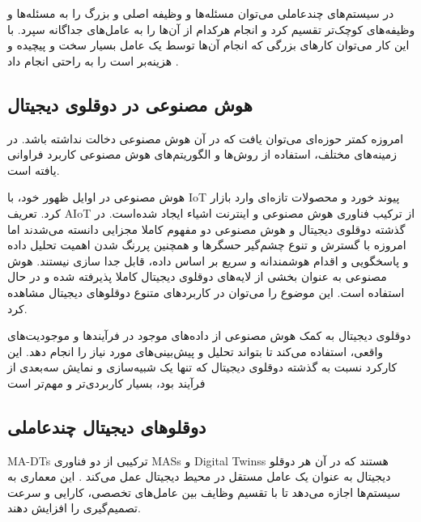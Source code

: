 
در سیستم‌های چندعاملی می‌توان مسئله‌ها و وظیفه اصلی و بزرگ را به مسئله‌ها و وظیفه‌های کوچک‌تر تقسیم کرد و انجام هرکدام از آن‌ها را به عامل‌های جداگانه سپرد. با این کار می‌توان کارهای بزرگی که انجام آن‌ها توسط یک عامل بسیار سخت و پیچیده  و هزینه‌بر است را به راحتی انجام داد \cite{dorri2018multiagent}.



\subsection{هوش مصنوعی در دوقلوی دیجیتال}

امروزه کمتر حوزه‌ای می‌توان یافت که در آن هوش مصنوعی دخالت نداشته‌ باشد. در زمینه‌های مختلف، استفاده از روش‌ها و الگوریتم‌های هوش مصنوعی کاربرد فراوانی یافته است. 

هوش مصنوعی در اوایل ظهور خود، با
\gls{IoT}
پیوند خورد و محصولات تازه‌ای وارد بازار کرد. تعریف 
\gls{AIoT}
از ترکیب فناوری هوش مصنوعی و اینترنت اشیاء ایجاد شده‌است. در گذشته دوقلوی دیجیتال و هوش مصنوعی دو مفهوم کاملا مجزایی دانسته می‌شدند اما امروزه با گسترش و تنوع چشم‌گیر حسگر‌ها و همچنین پررنگ شدن اهمیت تحلیل داده‌ و پاسخگویی و اقدام هوشمندانه و سریع بر اساس داده، قابل جدا سازی نیستند. هوش مصنوعی به عنوان بخشی از لایه‌های دوقلوی دیجیتال کاملا پذیرفته شده و در حال استفاده است. این موضوع را می‌توان در کاربرد‌های متنوع دوقلو‌های دیجیتال مشاهده کرد.

دوقلوی دیجیتال به کمک هوش مصنوعی از داده‌های موجود در فرآیندها و موجودیت‌های واقعی، استفاده می‌کند تا بتواند تحلیل و پیش‌بینی‌های مورد نیاز را انجام دهد. این کارکرد نسبت به گذشته دوقلوی دیجیتال که تنها یک شبیه‌سازی و نمایش سه‌بعدی از فرآیند بود، بسیار کاربردی‌تر و مهم‌تر است \cite{rozbahani2023design}


\subsection{دوقلوهای دیجیتال چندعاملی}


\glspl{MA-DT}
ترکیبی از دو فناوری \glspl{MAS} و \glspl{Digital Twins} هستند که در آن هر دوقلو دیجیتال به عنوان یک عامل مستقل در محیط دیجیتال عمل می‌کند \cite{pretel2022masdt,wang2024multiagent}. این معماری به سیستم‌ها اجازه می‌دهد تا با تقسیم وظایف بین عامل‌های تخصصی، کارایی و سرعت تصمیم‌گیری را افزایش دهند. 

